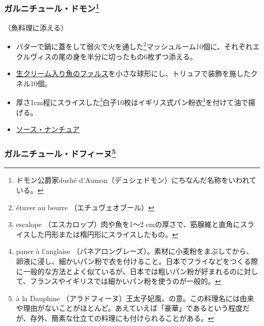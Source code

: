 \begin{recette}
\hypertarget{garniture-Daumont}{%
\subsubsection[ガルニチュール・ドモン]{\texorpdfstring{ガルニチュール・ドモン\footnote{ドモン公爵家duché
  d'Aumon（デュシェドモン）にちなんだ名称をいわれている。}}{ガルニチュール・ドモン}}\label{garniture-Daumont}}



（魚料理に添える）

\begin{itemize}
\item
  バターで鍋に蓋をして弱火で火を通した\footnote{étuver au beurre
    （エチュヴェオブール）}マッシュルーム10個に、それぞれエクルヴィスの尾の身を半分に切ったもの6枚ずつ添える。
\item
  \protect\hyperlink{farce-c}{生クリーム入り魚のファルス}を小さな球形にし、トリュフで装飾を施したクネル10個。
\item
  厚さ1cm程にスライスした\footnote{escalope （エスカロップ）肉や魚を1〜2
    cmの厚さで、筋腺維と直角にスライスした円形または楕円形にスライスしたもの。}白子10枚はイギリス式パン粉衣\footnote{paner
    à l'anglaise
    （パネアロングレーズ）。素材に小麦粉をまぶしてから、卵液に浸し、細かいパン粉で衣を付けること。日本でフライなどをつくる際に一般的な方法とよく似ているが、日本では粗いパン粉が好まれるのに対して、フランスやイギリスでは細かいパン粉を使うのが一般的。}を付けて油で揚げる。
\item
  \protect\hyperlink{sauce-nantua}{ソース・ナンチュア}
\end{itemize}

\hypertarget{garniture-a-la-dauphine}{%
\subsubsection[ガルニチュール・ドフィーヌ]{\texorpdfstring{ガルニチュール・ドフィーヌ\footnote{à
  la Dauphine
  （アラドフィーヌ）王太子妃風、の意。この料理名には由来や理由がないことがほとんど。あえていえば「豪華」であるという程度だが、存外、簡素な仕立ての料理にも付けられることがある。}}{ガルニチュール・ドフィーヌ}}\label{garniture-a-la-dauphine}}



\end{recette}
